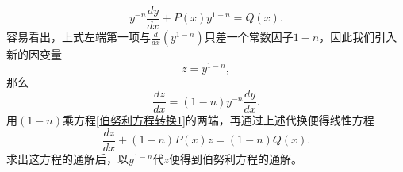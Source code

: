 \begin{equation}
  \label{伯努利方程转换1}
  y^{-n}\frac{dy}{dx} + P(x)y^{1-n}=Q(x).
\end{equation}
容易看出，上式左端第一项与$\displaystyle\frac{d}{dx}(y^{1-n})$只差一个常数因子$1-n$，因此我们引入新的因变量
\begin{equation*}
  z=y^{1-n},
\end{equation*}
那么
\begin{equation*}
  \frac{dz}{dx} = (1-n)y^{-n}\frac{dy}{dx}.
\end{equation*}
用$(1-n)$乘方程\eqref{伯努利方程转换1}的两端，再通过上述代换便得线性方程
\begin{equation*}
  \frac{dz}{dx} + (1-n)P(x)z = (1-n)Q(x).
\end{equation*}
求出这方程的通解后，以$y^{1-n}$代$z$便得到伯努利方程的通解。
